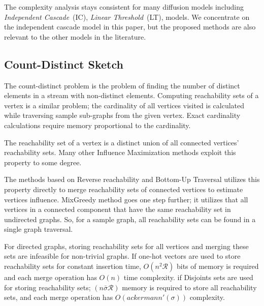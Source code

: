 \documentclass[10pt,journal,compsoc]{IEEEtran}
\begin{document}
The complexity analysis stays consistent for many diffusion models including {\em Independent Cascade}~(IC), {\em Linear Threshold}~(LT),  models. 
We concentrate on the independent cascade model in this paper, but the proposed methods are also relevant to the other models in the literature.


\subsection{Count-Distinct Sketch}\label{sec:sketch}
The count-distinct problem is the problem of finding the number of distinct elements in a stream with non-distinct elements. Computing reachability sets of a vertex is a similar problem; the cardinality of all vertices visited is calculated while traversing sample sub-graphs from the given vertex. Exact cardinality calculations require memory proportional to the cardinality. 

The reachability set of a vertex is a distinct union of all connected vertices' reachability sets. Many other Influence Maximization methods exploit this property to some degree. 

The methods based on Reverse reachability and Bottom-Up Traversal utilizes this property directly to merge reachability sets of connected vertices to estimate vertices influence.
MixGreedy method goes one step further; it utilizes that all vertices in a connected component that have the same reachability set in undirected graphs. So, for a sample graph, all reachability sets can be found in a single graph traversal. 

For directed graphs, storing reachability sets for all vertices and merging these sets are infeasible for non-trivial graphs. 
If one-hot vectors are used to store reachability sets for constant insertion time, $O(n^2\mathcal{R})$ bits of memory is required and each merge operation has $O(n)$ time complexity. 
if Disjoints sets are used for storing reachability sets; $(n\bar{\sigma}\mathcal{R})$ memory is required to store all reachability sets, and each merge operation has $O(ackermann'(\sigma))$ complexity.
\end{document}
